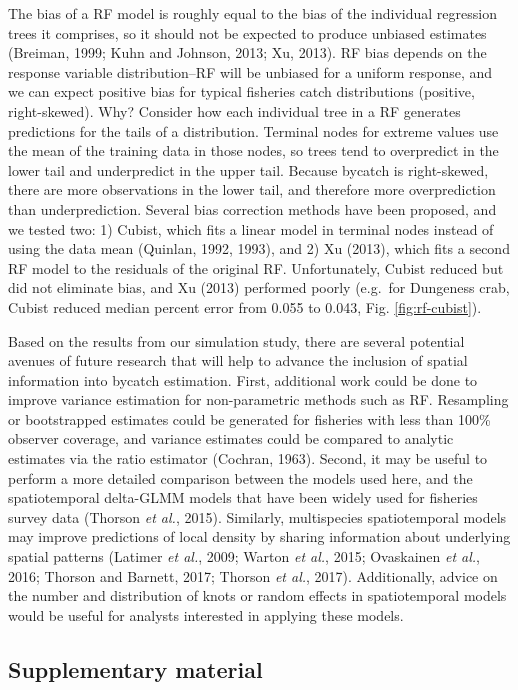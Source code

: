 \documentclass[]{article}
\begin{document}
The bias of a RF model is roughly equal to the bias of the individual
regression trees it comprises, so it should not be expected to produce
unbiased estimates (Breiman, 1999; Kuhn and Johnson, 2013; Xu, 2013). RF
bias depends on the response variable distribution--RF will be unbiased
for a uniform response, and we can expect positive bias for typical
fisheries catch distributions (positive, right-skewed). Why? Consider
how each individual tree in a RF generates predictions for the tails of
a distribution. Terminal nodes for extreme values use the mean of the
training data in those nodes, so trees tend to overpredict in the lower
tail and underpredict in the upper tail. Because bycatch is
right-skewed, there are more observations in the lower tail, and
therefore more overprediction than underprediction. Several bias
correction methods have been proposed, and we tested two: 1) Cubist,
which fits a linear model in terminal nodes instead of using the data
mean (Quinlan, 1992, 1993), and 2) Xu (2013), which fits a second RF
model to the residuals of the original RF. Unfortunately, Cubist reduced
but did not eliminate bias, and Xu (2013) performed poorly (e.g.~for
Dungeness crab, Cubist reduced median percent error from 0.055 to 0.043,
Fig. \ref{fig:rf-cubist}).

Based on the results from our simulation study, there are several
potential avenues of future research that will help to advance the
inclusion of spatial information into bycatch estimation. First,
additional work could be done to improve variance estimation for
non-parametric methods such as RF. Resampling or bootstrapped estimates
could be generated for fisheries with less than 100\% observer coverage,
and variance estimates could be compared to analytic estimates via the
ratio estimator (Cochran, 1963). Second, it may be useful to perform a
more detailed comparison between the models used here, and the
spatiotemporal delta-GLMM models that have been widely used for
fisheries survey data (Thorson \emph{et al.}, 2015). Similarly,
multispecies spatiotemporal models may improve predictions of local
density by sharing information about underlying spatial patterns
(Latimer \emph{et al.}, 2009; Warton \emph{et al.}, 2015; Ovaskainen
\emph{et al.}, 2016; Thorson and Barnett, 2017; Thorson \emph{et al.},
2017). Additionally, advice on the number and distribution of knots or
random effects in spatiotemporal models would be useful for analysts
interested in applying these models.

\subsection{Supplementary material}\label{supplementary-material}
\end{document}
